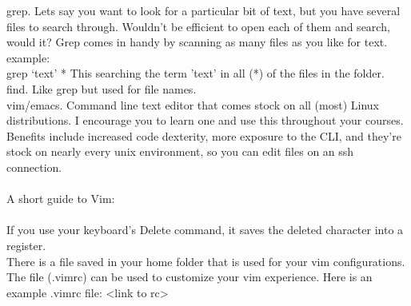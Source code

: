 \documentclass[letterpaper,10pt,titlepage,fleqn]{article}
\begin{document}
grep. Lets say you want to look for a particular bit of text, but you have
several files to search through. Wouldn’t be efficient to open each of them and
search, would it? Grep comes in handy by scanning as many files as you like for
text.\\
example:\\
grep ‘text’ *			This searching the term 'text' in all (*) of the files
in the folder.\\


find. Like grep but used for file names.\\

vim/emacs.  Command line text editor that comes stock on all (most) Linux
distributions. I encourage you to learn one and use this throughout your
courses. Benefits include increased code dexterity, more exposure to the CLI,
and they’re stock on nearly every unix environment, so you can edit files on an
ssh connection. \\
\\
A short guide to Vim:\\
\\
If you use your keyboard’s Delete command, it saves the deleted character into a
register.\\

There is a file saved in your home folder that is used for your vim
configurations. The file (.vimrc) can be used to customize your vim experience.
Here is an example .vimrc file: <link to rc>\\
\end{document}
